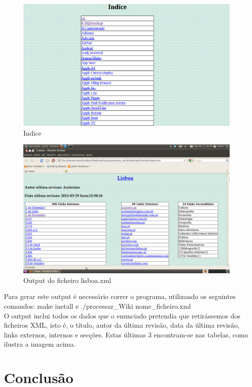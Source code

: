 \documentclass[a4paper,11pt,openright,openbib]{report}
\begin{document}
\begin{figure}[!htb]
     \centering
     \includegraphics[scale=0.5]{imagens/indice.png}
     \caption{Indice}
\end{figure}  
\clearpage
\begin{figure}[!htb]
     \centering
     \includegraphics[scale=0.35]{imagens/print.png}
     \caption{Output do ficheiro lisboa.xml}
\end{figure}  


Para gerar este output é necessário correr o programa, utilizando os seguintes comandos: make install e ./processar\_Wiki nome\_ficheiro.xml \\
O output inclui todos os dados que o enunciado pretendia que retirássemos dos ficheiros XML, isto é, o título, autor da última revisão, data da última revisão, links externos, internos e secções. Estas últimas 3 encontram-se nas tabelas, como ilustra a imagem acima.



\chapter{Conclusão}
\end{document}
